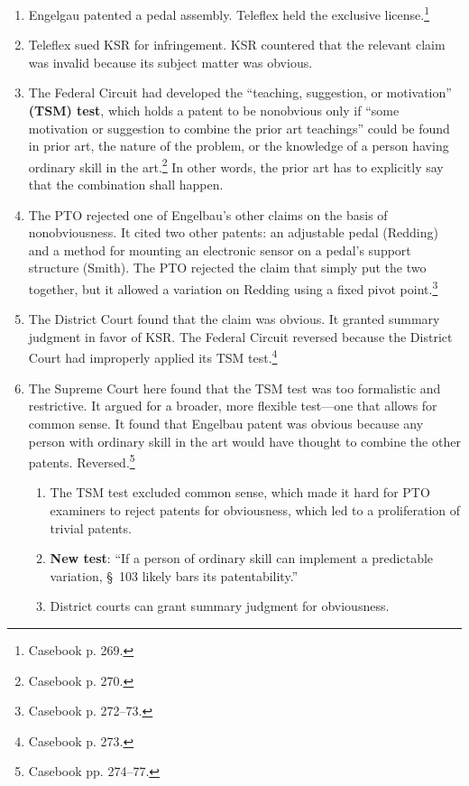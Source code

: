 \begin{enumerate}
    \item Engelgau patented a pedal assembly. Teleflex held the exclusive 
    license.\footnote{Casebook p. 269.}
    \item Teleflex sued KSR for infringement. KSR countered that the relevant 
    claim was invalid because its subject matter was obvious.
    \item The Federal Circuit had developed the ``teaching, suggestion, or 
    motivation'' \textbf{(TSM) test}, which holds a patent to be nonobvious 
    only if ``some motivation or suggestion to combine the prior art 
    teachings'' could be found in prior art, the nature of the problem, or the 
    knowledge of a person having ordinary skill in the art.\footnote{Casebook 
    p. 270.} In other words, the prior art has to explicitly say that the 
    combination shall happen.
    \item The PTO rejected one of Engelbau's other claims on the basis of 
    nonobviousness. It cited two other patents: an adjustable pedal (Redding) 
    and a method for mounting an electronic sensor on a pedal's support 
    structure (Smith). The PTO rejected the claim that simply put the two 
    together, but it allowed a variation on Redding using a fixed pivot 
    point.\footnote{Casebook p. 272--73.}
    \item The District Court found that the claim was obvious. It granted 
    summary judgment in favor of KSR. The Federal Circuit reversed because the 
    District Court had improperly applied its TSM test.\footnote{Casebook p. 
    273.}
    \item The Supreme Court here found that the TSM test was too formalistic 
    and restrictive. It argued for a broader, more flexible test---one that 
    allows for common sense. It found that Engelbau patent was obvious because 
    any person with ordinary skill in the art would have thought to combine 
    the other patents.  Reversed.\footnote{Casebook pp. 274--77.}
    \begin{enumerate}
        \item The TSM test excluded common sense, which made it hard for PTO 
        examiners to reject patents for obviousness, which led to a 
        proliferation of trivial patents.
        \item \textbf{New test}: ``If a person of ordinary skill can implement 
        a predictable variation, \S\ 103 likely bars its patentability.''
        \item District courts can grant summary judgment for obviousness.
    \end{enumerate}
\end{enumerate}

